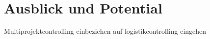 \section{Ausblick und Potential}
Multiprojektcontrolling einbeziehen
auf logistikcontrolling eingehen